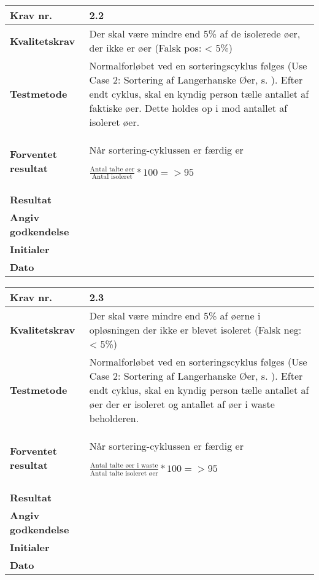  	\begin{center}
		\begin{longtable}{ | m{4cm}| m{8.5cm}|} 
			\hline
			\textbf{Krav nr.} & 2.2 \\ 
			\hline
			\textbf{Kvalitetskrav} & Der skal være mindre end 5\% af de isolerede øer, der ikke er øer
(Falsk pos: < 5\%) \\
			\hline
			\textbf{Testmetode} & Normalforløbet ved en sorteringscyklus følges (Use Case 2: Sortering af Langerhanske Øer, s.  \pageref{uc:2}). Efter endt cyklus, skal en kyndig person tælle antallet af faktiske øer. Dette holdes op i mod antallet af isoleret øer.  \\
			\hline
			\textbf{Forventet resultat}  & Når sortering-cyklussen er færdig er

$\frac{\text{Antal talte øer}}{\text{Antal isoleret}}*100=>95$  \\
			\hline
			\textbf{Resultat}  &    \\
			\hline
			\textbf{Angiv godkendelse} &     \\
			\hline
			\textbf{Initialer} &     \\
			\hline
			\textbf{Dato} &    \\
			\hline
		\end{longtable}
	\end{center}	
			
 	\begin{center}
		\begin{longtable}{ | m{4cm}| m{8.5cm}|} 
			\hline
			\textbf{Krav nr.} & 2.3 \\ 
			\hline
			\textbf{Kvalitetskrav} & Der skal være mindre end 5\% af øerne i opløsningen der ikke er blevet isoleret
(Falsk neg: < 5\%) \\
			\hline
			\textbf{Testmetode} & Normalforløbet ved en sorteringscyklus følges (Use Case 2: Sortering af Langerhanske Øer, s.  \pageref{uc:2}). Efter endt cyklus, skal en kyndig person tælle antallet af øer der er isoleret og antallet af øer i waste beholderen.  \\
			\hline
			\textbf{Forventet resultat}  & Når sortering-cyklussen er færdig er

$\frac{\text{Antal talte øer i waste}}{\text{Antal talte isoleret øer}}*100= >95$  \\
			\hline
			\textbf{Resultat}  &    \\
			\hline
			\textbf{Angiv godkendelse} &     \\
			\hline
			\textbf{Initialer} &     \\
			\hline
			\textbf{Dato} &    \\
			\hline
		\end{longtable}
	\end{center}		
			
